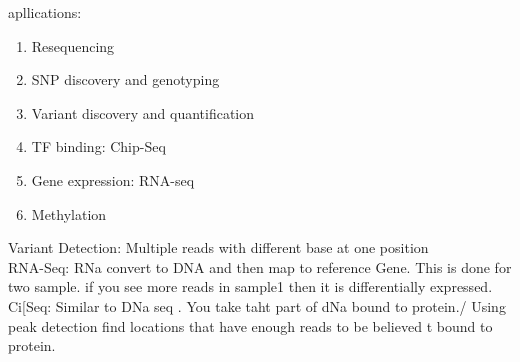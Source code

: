 \documentclass[a4paper]{article}
\begin{document}
apllications: \\


\begin{enumerate}
\item Resequencing
\item SNP discovery and genotyping
\item Variant discovery and quantification
\item TF binding: Chip-Seq
\item Gene expression: RNA-seq
\item Methylation


\end{enumerate}


Variant Detection: Multiple reads with different base at one position \\
RNA-Seq: RNa convert to DNA and then map to reference Gene. This is done for two sample. if you see more reads in sample1 then it is differentially expressed.\\
Ci[Seq: Similar to DNa seq . You take taht part of dNa bound to protein./ Using peak detection find locations that have enough reads to be believed t
bound to protein.
\end{document}
